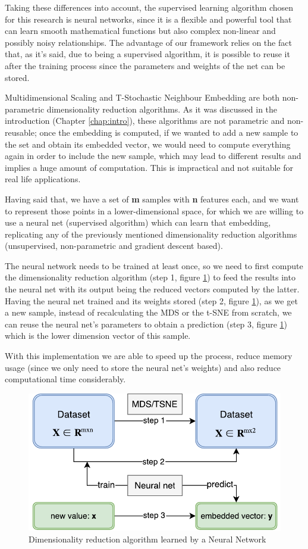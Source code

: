 \documentclass[a4paper,11pt,spanish]{report}
\begin{document}
Taking these differences into account, the supervised learning algorithm chosen for this research is neural networks, since it is a flexible and powerful tool that can learn smooth mathematical functions but also complex non-linear and possibly noisy relationships. The advantage of our framework relies on the fact that, as it's said, due to being a supervised algorithm, it is possible to reuse it after the training process since the parameters and weights of the net can be stored.

Multidimensional Scaling and T-Stochastic Neighbour Embedding are both non-parametric dimensionality reduction algorithms. As it was discussed in the introduction (Chapter \ref{chap:intro}), these algorithms are not parametric and  non-reusable; once the embedding is computed, if we wanted to add a new sample to the set and obtain its embedded vector, we would need to compute everything again in order to include the new sample, which may lead to different results and implies a huge amount of computation. This is impractical and not suitable for real life applications.

Having said that, we have a set of \textbf{m} samples with \textbf{n} features each, and we want to represent those points in a lower-dimensional space, for which we are willing to use a neural net (supervised algorithm) which can learn that embedding, replicating any of the previously mentioned dimensionality reduction algorithms (unsupervised, non-parametric and gradient descent based).

The neural network needs to be trained at least once, so we need to first compute the dimensionality reduction algorithm (step 1, figure \ref{figurenet}) to feed the results into the neural net with its output being the reduced vectors computed by the latter. Having the neural net trained and its weights stored (step 2, figure \ref{figurenet}), as we get a new sample, instead of recalculating the MDS or the t-SNE from scratch, we can reuse the neural net's parameters to obtain a prediction (step 3, figure \ref{figurenet}) which is the lower dimension vector of this sample.

With this implementation we are able to speed up the process, reduce memory usage (since we only need to store the neural net's weights) and also reduce computational time considerably.

\begin{figure}[p]
\centering
\includegraphics[width=12cm]{figures/neuralnet.pdf}
\caption{\label{figurenet}Dimensionality reduction algorithm learned by a Neural Network}
\end{figure}
\end{document}
